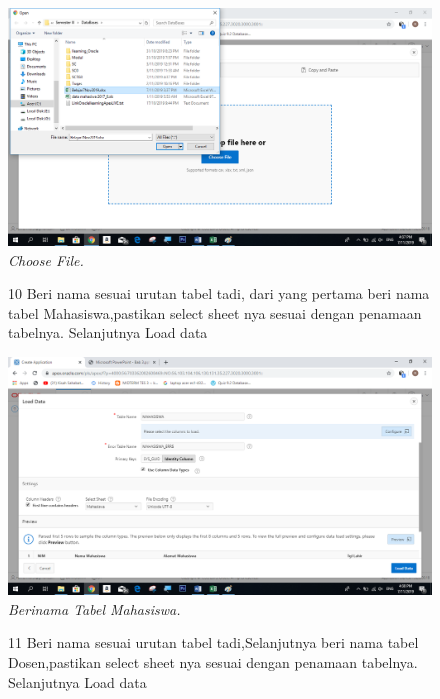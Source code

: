 \begin{enumerate}
\begin{figure}
    \begin{center}
    \includegraphics[scale=0.5]{figures/9.png}
    \caption{\textit{Choose File.}}
     \end{center}
    \label{gambar}
    \end{figure}

\begin{figure}
\item[10]Beri nama sesuai urutan tabel tadi, dari yang pertama beri nama tabel Mahasiswa,pastikan select sheet nya sesuai dengan penamaan tabelnya. Selanjutnya Load data

    \begin{center}
    \includegraphics[scale=0.4]{figures/10.png}
    \caption{\textit{Berinama Tabel Mahasiswa.}}
    \end{center}
    \label{gambar}
    \end{figure}

\begin{figure}
\item[11]Beri nama sesuai urutan tabel tadi,Selanjutnya beri nama tabel Dosen,pastikan select sheet nya sesuai dengan penamaan tabelnya. Selanjutnya Load data


\end{figure}
\end{enumerate}
